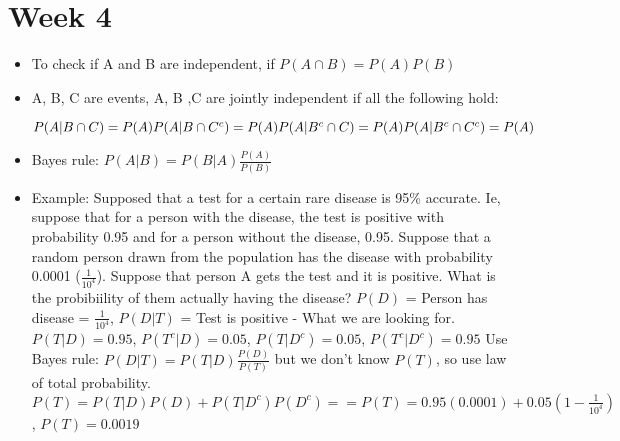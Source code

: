 \documentclass[12pt]{article}
\begin{document}
    \section{Week 4}
    \begin{itemize}
        \setlength\itemsep{0.1em}
        \item To check if A and B are independent, if $P(A \cap B) = P(A)P(B)$
        \item A, B, C are events, A, B ,C are jointly independent if all the following hold: \newline
        \begin{fleqn}
            $
            P(A|B \cap C) = P(A) \newline
            P(A|B \cap C^c) = P(A) \newline
            P(A|B^c \cap C ) = P(A) \newline
            P(A|B^c \cap C^c) = P(A) \newline
            $
        \end{fleqn}
        \item Bayes rule: $P(A|B) = P(B|A)\frac{P(A)}{P(B)}$
        \item Example: Supposed that a test for a certain rare disease is 95\% accurate. Ie, suppose that for a person with the disease,
        the test is positive with probability 0.95 and for a person without the disease, 0.95. Suppose that a random person drawn from
        the population has the disease with probability 0.0001 ($\frac{1}{10^4}$). Suppose that person A gets the test and it is positive.
        What is the probibiility of them actually having the disease? \newline\newline
        $P(D)$ = Person has disease = $\frac{1}{10^4}$, $P(D|T)$ = Test is positive - What we are looking for. \newline
        $P(T|D) = 0.95$, $P(T^c|D) = 0.05$, $P(T|D^c) = 0.05$, $P(T^c|D^c) = 0.95$ \newline
        Use Bayes rule: $P(D|T) = P(T|D)\frac{P(D)}{P(T)}$ but we don't know $P(T)$, so use law of total probability. \newline
        $P(T) = P(T|D)P(D)+P(T|D^c)P(D^c) == P(T) = 0.95(0.0001) + 0.05(1-\frac{1}{10^4})$, $P(T) = 0.0019$
    \end{itemize}
\end{document}
